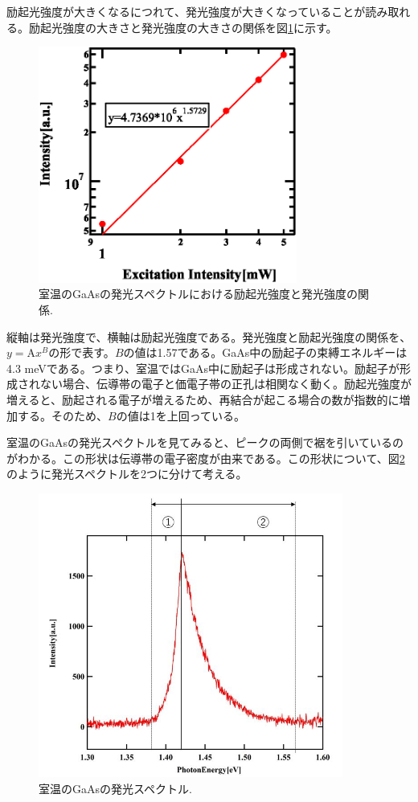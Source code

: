 \documentclass[11pt,a4j]{jsarticle}
\begin{document}
励起光強度が大きくなるにつれて、発光強度が大きくなっていることが読み取れる。励起光強度の大きさと発光強度の大きさの関係を図\ref{fig_gaas_rt_int1}に示す。
\newpage

\begin{figure}[ht]
 \centering
 \includegraphics[clip,width=8.5cm]{start2_GaAs_rt_Int.eps}
 \caption{室温のGaAsの発光スペクトルにおける励起光強度と発光強度の関係.}
 \label{fig_gaas_rt_int1}
\end{figure}

縦軸は発光強度で、横軸は励起光強度である。発光強度と励起光強度の関係を、$y=\mathrm{A}x^{B}$の形で表す。$B$の値は1.57である。GaAs中の励起子の束縛エネルギーは4.3 meVである\cite{exciton}。つまり、室温ではGaAs中に励起子は形成されない。励起子が形成されない場合、伝導帯の電子と価電子帯の正孔は相関なく動く。励起光強度が増えると、励起される電子が増えるため、再結合が起こる場合の数が指数的に増加する。そのため、$B$の値は1を上回っている。


室温のGaAsの発光スペクトルを見てみると、ピークの両側で裾を引いているのがわかる。この形状は伝導帯の電子密度が由来である。この形状について、図\ref{fig_lumine1}のように発光スペクトルを2つに分けて考える。

\newpage

\begin{figure}[h]
 \centering
 \includegraphics[clip,width=10cm]{start_lumine.jpg}
 \caption{室温のGaAsの発光スペクトル.}
 \label{fig_lumine1}
\end{figure}
\end{document}
